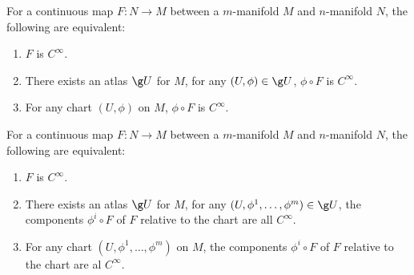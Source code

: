 For a continuous map $F \colon N \to M$ between a $m$-manifold $M$ and $n$-manifold $N$, the following are equivalent:
\begin{enumerate}
\item $F$ is $C^\infty$.
\item There exists an atlas $\g U$ for $M$, for any $(U, \phi) \in \g U$, $\phi \circ F$ is $C^\infty$.
\item For any chart $(U, \phi)$ on $M$, $\phi \circ F$ is $C^\infty$.
\end{enumerate}

For a continuous map $F \colon N \to M$ between a $m$-manifold $M$ and $n$-manifold $N$, the following are equivalent:
\begin{enumerate}
\item $F$ is $C^\infty$.
\item There exists an atlas $\g U$ for $M$, for any $(U, \phi^1, \dotsc, \phi^m) \in \g U$, the components $\phi^i \circ F$ of $F$ relative to the chart are all $C^\infty$.
\item For any chart $(U, \phi^1, \dotsc, \phi^m)$ on $M$, the components $\phi^i \circ F$ of $F$ relative to the chart are al $C^\infty$.
\end{enumerate}
